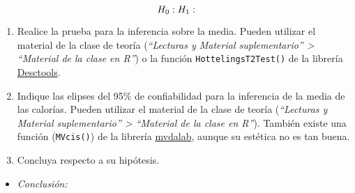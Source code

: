 \documentclass[
]{article}
\providecommand{\tightlist}{%
  \setlength{\itemsep}{0pt}\setlength{\parskip}{0pt}}
\begin{document}
\[
H_0: \\
H_1: 
\]

\begin{enumerate}
\def\labelenumi{\alph{enumi}.}
\setcounter{enumi}{1}
\item
  Realice la prueba para la inferencia sobre la media. Pueden utilizar
  el material de la clase de teoría (\emph{``Lecturas y Material
  suplementario'' \textgreater{} ``Material de la clase en R''}) o la
  función \texttt{HottelingsT2Test()} de la librería
  \href{https://search.r-project.org/CRAN/refmans/DescTools/html/HotellingsT.html}{Desctools}.
\item
  Indique las elipses del 95\% de confiabilidad para la inferencia de la
  media de las calorías. Pueden utilizar el material de la clase de
  teoría (\emph{``Lecturas y Material suplementario'' \textgreater{}
  ``Material de la clase en R''}). También existe una función
  (\texttt{MVcis()}) de la librería
  \href{https://rdrr.io/cran/mvdalab/man/MVcis.html}{mvdalab}, aunque su
  estética no es tan buena.
\item
  Concluya respecto a su hipótesis.
\end{enumerate}

\begin{itemize}
\tightlist
\item
  \emph{Conclusión:}
\end{itemize}
\end{document}
